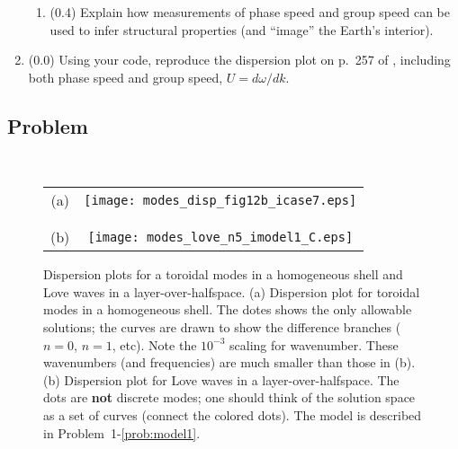 \documentclass[11pt,titlepage,fleqn]{article}
\begin{document}
\begin{enumerate}
\begin{enumerate}
\item (0.4) Explain how measurements of phase speed and group speed can be used to infer structural properties (and ``image'' the Earth's interior).
\end{enumerate}


\item (0.0) Using your code, reproduce the dispersion plot on p.~257 of \citet{AkiRichardsE2}, including both phase speed and group speed, $U = d\omega/dk$.


\end{enumerate}


\subsection*{Problem} \howmuchtime\

\pagebreak






\clearpage\pagebreak
\begin{figure}
\centering
\begin{tabular}{cc}
(a) & \texttt{[image: modes\_disp\_fig12b\_icase7.eps]} \\
& \\ & \\
(b) & \texttt{[image: modes\_love\_n5\_imodel1\_C.eps]} 
\end{tabular}
\caption[]
{{
Dispersion plots for a toroidal modes in a homogeneous shell and Love waves in a layer-over-halfspace.
(a) Dispersion plot for toroidal modes in a homogeneous shell. The dotes shows the only allowable solutions; the curves are drawn to show the difference branches ($n=0$, $n=1$, etc). 
Note the $10^{-3}$ scaling for wavenumber. These wavenumbers (and frequencies) are much smaller than those in (b).
(b) Dispersion plot for Love waves in a layer-over-halfspace. The dots are {\bf not} discrete modes; one should think of the solution space as a set of curves (\ie connect the colored dots).
The model is described in Problem~1-\ref{prob:model1}.
\label{fig:dots}
}}
\end{figure}
\end{document}
